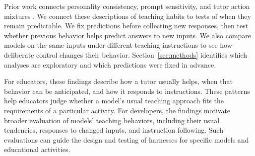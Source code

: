 Prior work connects personality consistency, prompt sensitivity, and tutor
action mixtures \citep{lee2025trait,kucheria2025cima,liu2026bma,lee2026tutorpersonas}.
We connect these descriptions of teaching habits to tests of when they remain
predictable. We fix predictions before collecting new responses, then test
whether previous behavior helps predict answers to new inputs. We also compare
models on the same inputs under different teaching instructions to see how
deliberate control changes their behavior. Section~\ref{sec:methods} identifies
which analyses are exploratory and which predictions were fixed in advance.

For educators, these findings describe how a tutor usually helps, when that
behavior can be anticipated, and how it responds to instructions. These patterns
help educators judge whether a model's usual teaching approach fits the
requirements of a particular activity. For developers, the findings motivate
broader evaluation of models' teaching behaviors, including their usual
tendencies, responses to changed inputs, and instruction following. Such
evaluations can guide the design and testing of harnesses for specific models
and educational activities.
